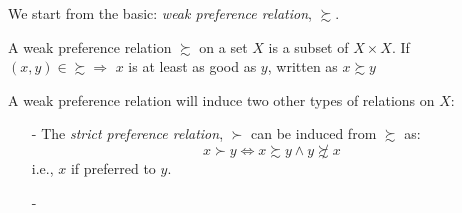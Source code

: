 We start from the basic: \textit{weak preference relation}, $\succsim$.
\begin{definition}
    A weak preference relation $\succsim$ on a set $X$ is a subset of $X\times X$. If $(x,y)\in \succsim \Rightarrow$ $x$ is at least as good as $y$, written as $x\succsim y$
\end{definition}

A weak preference relation will induce two other types of relations on $X$:
\begin{definition}
    \begin{enumerate}
        \item[-] The \textit{strict preference relation}, $\succ$ can be induced from $\succsim$ as: 
        $$x\succ y\Leftrightarrow x\succsim y \wedge y\not\succsim x$$
        i.e.,  $x$ if preferred to $y$.
        \item[-]
    \end{enumerate}
\end{definition}